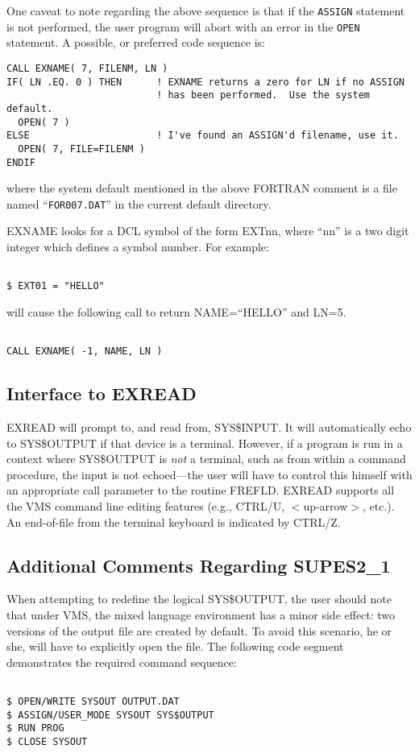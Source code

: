 One caveat to note regarding the above sequence is that if the \verb+ASSIGN+
statement is not performed,
the user program will abort with an error in the \verb+OPEN+ statement.
A possible,
or preferred code sequence is:
\begin{verbatim}
CALL EXNAME( 7, FILENM, LN )
IF( LN .EQ. 0 ) THEN      ! EXNAME returns a zero for LN if no ASSIGN
                          ! has been performed.  Use the system default.
  OPEN( 7 )
ELSE                      ! I've found an ASSIGN'd filename, use it.
  OPEN( 7, FILE=FILENM )
ENDIF
\end{verbatim}
where the system default mentioned in the above FORTRAN comment
is a file named ``\verb+FOR007.DAT+'' in the current
default directory.

EXNAME looks for a DCL symbol of the form EXTnn, where ``nn'' is a two digit
integer which defines a symbol number.  For example:
\begin{verbatim}

$ EXT01 = "HELLO"

\end{verbatim}
will cause the following call to return NAME=``HELLO'' and LN=5.
\begin{verbatim}

CALL EXNAME( -1, NAME, LN )

\end{verbatim}

\subsection{Interface to EXREAD} 
EXREAD will prompt to,
and read from,
SYS\$INPUT.
It will automatically echo to SYS\$OUTPUT if that device is a terminal.
However,
if a program is run in a context where SYS\$OUTPUT is {\em not} a
terminal,
such as from within a command procedure,
the input is not echoed---the user will have to control this
himself with an appropriate call parameter to the routine FREFLD.
EXREAD supports all the VMS command line editing features (e.g., CTRL/U,
$<$up-arrow$>$, etc.).  An end-of-file from the terminal keyboard is
indicated by CTRL/Z. 

\subsection{Additional Comments Regarding SUPES2\_1}
When attempting to redefine the logical SYS\$OUTPUT,
the user should note that under VMS,
the mixed language environment has a minor side effect:
two versions of the output file are created by default.
To avoid this scenario,
he or she,
will have to explicitly open the file.
The following code segment demonstrates the required command sequence:
\begin{verbatim}

$ OPEN/WRITE SYSOUT OUTPUT.DAT
$ ASSIGN/USER_MODE SYSOUT SYS$OUTPUT
$ RUN PROG
$ CLOSE SYSOUT

\end{verbatim}

